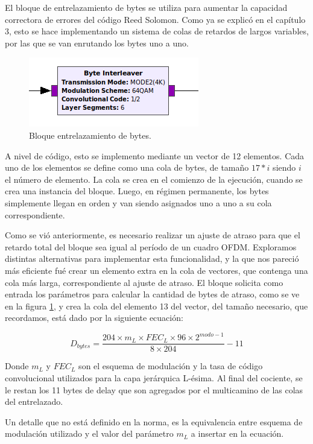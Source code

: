 El bloque de entrelazamiento de bytes se utiliza para aumentar la capacidad correctora de errores del código Reed Solomon. Como ya se explicó en el capítulo 3, esto se hace implementando un sistema de colas de retardos de largos variables, por las que se van enrutando los bytes uno a uno. 

\begin{figure}[!h]
	\centering
	\includegraphics[scale=0.6]{figuras/cap05/byteint}
	\caption{\label{f:byteint} Bloque entrelazamiento de bytes.}
\end{figure}

A nivel de código, esto se implemento mediante un vector de 12 elementos. Cada uno de los elementos se define como una cola de bytes, de tamaño $17*i$ siendo $i$ el número de elemento. La cola se crea en el comienzo de la ejecución, cuando se crea una instancia del bloque. Luego, en régimen permanente, los bytes simplemente llegan en orden y van siendo asignados uno a uno a su cola correspondiente.

Como se vió anteriormente, es necesario realizar un ajuste de atraso para que el retardo total del bloque sea igual al período de un cuadro OFDM. Exploramos distintas alternativas para implementar esta funcionalidad, y la que nos pareció más eficiente fué crear un elemento extra en la cola de vectores, que contenga una cola más larga, correspondiente al ajuste de atraso. El bloque solicita como entrada los parámetros para calcular la cantidad de bytes de atraso, como se ve en la figura \ref{f:byteint}, y crea la cola del elemento 13 del vector, del tamaño necesario, que recordamos, está dado por la siguiente ecuación:

\begin{equation}
D_{bytes} = \frac{204\times m_L\times FEC_L \times 96\times2^{modo-1}}{8\times204} - 11
\end{equation}

Donde $m_L$ y $FEC_L$ son el esquema de modulación y la tasa de código convolucional utilizados para la capa jerárquica L-ésima. Al final del cociente, se le restan los 11 bytes de delay que son agregados por el multicamino de las colas del entrelazado.

Un detalle que no está definido en la norma, es la equivalencia entre esquema de modulación utilizado y el valor del parámetro $m_L$ a insertar en la ecuación. 

